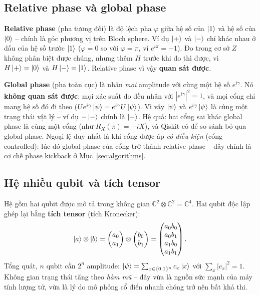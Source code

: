 \subsection{Relative phase và global phase}
\label{sec:phase}

\textbf{Relative phase} (pha tương đối) là độ lệch pha $\varphi$ giữa hệ số của $\ket{1}$ và hệ số
của $\ket{0}$ -- chính là góc phương vị trên Bloch sphere. Ví dụ $\ket{+}$ và $\ket{-}$ chỉ khác nhau
ở dấu của hệ số trước $\ket{1}$ ($\varphi = 0$ so với $\varphi = \pi$, vì $e^{i\pi} = -1$). Đo trong
cơ sở $Z$ không phân biệt được chúng, nhưng thêm $H$ trước khi đo thì được, vì $H\ket{+} = \ket{0}$
và $H\ket{-} = \ket{1}$. Relative phase vì vậy \textbf{quan sát được}.

\textbf{Global phase} (pha toàn cục) là nhân \emph{mọi} amplitude với cùng một hệ số $e^{i\gamma}$. Nó
\textbf{không quan sát được}: mọi xác suất đo đều nhân với $|e^{i\gamma}|^2 = 1$, và mọi cổng chỉ
mang hệ số đó đi theo ($Ue^{i\gamma}\ket{\psi} = e^{i\gamma}U\ket{\psi}$). Vì vậy $\ket{\psi}$ và
$e^{i\gamma}\ket{\psi}$ là cùng một trạng thái vật lý -- ví dụ $-\ket{-}$ chính là $\ket{-}$. Hệ quả:
hai cổng sai khác global phase là cùng một cổng (như $R_X(\pi) = -iX$), và Qiskit có
 để so sánh bỏ qua global phase. Ngoại lệ duy nhất là khi cổng được áp
\emph{có điều kiện} (cổng controlled): lúc đó global phase của cổng trở thành relative phase -- đây
chính là cơ chế phase kickback ở Mục~\ref{sec:algorithms}.

\subsection{Hệ nhiều qubit và tích tensor}

Hệ gồm hai qubit được mô tả trong không gian $\mathbb{C}^2 \otimes \mathbb{C}^2 = \mathbb{C}^4$.
Hai qubit độc lập ghép lại bằng \textbf{tích tensor} (tích Kronecker):
\begin{equation}
  \ket{a}\otimes\ket{b} =
  \begin{pmatrix}a_0\\a_1\end{pmatrix} \otimes \begin{pmatrix}b_0\\b_1\end{pmatrix}
  = \begin{pmatrix}a_0b_0\\a_0b_1\\a_1b_0\\a_1b_1\end{pmatrix}.
\end{equation}
Tổng quát, $n$ qubit cần $2^n$ amplitude: $\ket{\psi} = \sum_{x \in \{0,1\}^n} c_x \ket{x}$ với
$\sum_x |c_x|^2 = 1$. Không gian trạng thái tăng theo \emph{hàm mũ} -- đây vừa là nguồn sức mạnh của
máy tính lượng tử, vừa là lý do mô phỏng cổ điển nhanh chóng trở nên bất khả thi.

